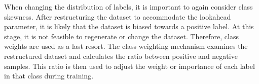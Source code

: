 When changing the distribution of labels, it is important to again consider class skewness. After restructuring the dataset to accommodate the lookahead parameter, it is likely that the dataset is biased towards a positive label. At this stage, it is not feasible to regenerate or change the dataset. Therefore, class weights are used as a last resort. The class weighting mechanism examines the restructured dataset and calculates the ratio between positive and negative samples. This ratio is then used to adjust the weight or importance of each label in that class during training.

